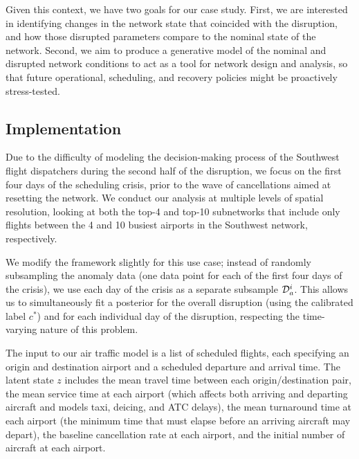 Given this context, we have two goals for our case study. First, we are interested in identifying changes in the network state that coincided with the disruption, and how those disrupted parameters compare to the nominal state of the network. Second, we aim to produce a generative model of the nominal and disrupted network conditions to act as a tool for network design and analysis, so that future operational, scheduling, and recovery policies might be proactively stress-tested.

\subsection{Implementation}

Due to the difficulty of modeling the decision-making process of the Southwest flight dispatchers during the second half of the disruption, we focus on the first four days of the scheduling crisis, prior to the wave of cancellations aimed at resetting the network. We conduct our analysis at multiple levels of spatial resolution, looking at both the top-4 and top-10 subnetworks that include only flights between the 4 and 10 busiest airports in the Southwest network, respectively.

We modify the \ouralg{} framework slightly for this use case; instead of randomly subsampling the anomaly data (one data point for each of the first four days of the crisis), we use each day of the crisis as a separate subsample $\mathcal{D}_a^i$. This allows us to simultaneously fit a posterior for the overall disruption (using the calibrated label $c^*$) and for each individual day of the disruption, respecting the time-varying nature of this problem.

The input to our air traffic model is a list of scheduled flights, each specifying an origin and destination airport and a scheduled departure and arrival time. The latent state $z$ includes the mean travel time between each origin/destination pair, the mean service time at each airport (which affects both arriving and departing aircraft and models taxi, deicing, and ATC delays), the mean turnaround time at each airport (the minimum time that must elapse before an arriving aircraft may depart), the baseline cancellation rate at each airport, and the initial number of aircraft at each airport.

